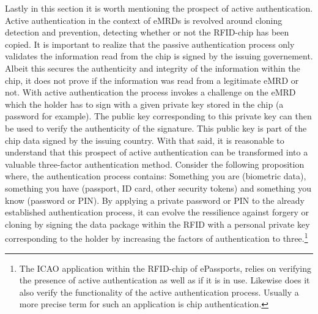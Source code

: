 \documentclass[12pt,
               a4paper,
               article,
               oneside,
               oldfontcommands,
               english]{memoir}
\begin{document}
Lastly in this section it is worth mentioning the prospect of active authentication. Active authentication in the context of eMRDs is revolved around cloning detection and prevention, detecting whether or not the RFID-chip has been copied. It is important to realize that the passive authentication process only validates the information read from the chip is signed by the issuing governement. Albeit this secures the authenticity and integrity of the information within the chip, it does not prove if the information was read from a legitimate eMRD or not. With active authentication the process invokes a challenge on the eMRD which the holder has to sign with a given private key stored in the chip (a password for example). The public key corresponding to this private key can then be used to verify the authenticity of the signature. This public key is part of the chip data signed by the issuing country.\cite{Read_id} With that said, it is reasonable to understand that this prospect of active authentication can be transformed into a valuable three-factor authentication method. Consider the following proposition where, the authentication process contains: Something you are (biometric data), something you have (passport, ID card, other security tokens) and something you know (password or PIN). By applying a private password or PIN to the already established authentication process, it can evolve the ressilience against forgery or cloning by signing the data package within the RFID with a personal private key corresponding to the holder by increasing the factors of authentication to three.\footnote{The ICAO application within the RFID-chip of ePassports, relies on verifying the presence of active authentication as well as if it is in use. Likewise does it also verify the functionality of the active authentication process. Usually a more precise term for such an application is chip authentication.} 
\end{document}
